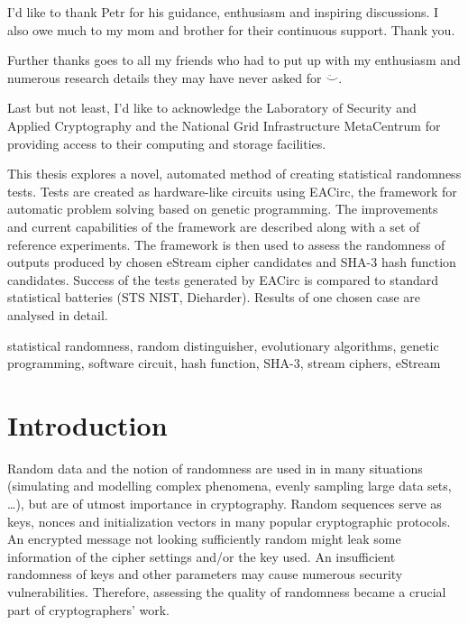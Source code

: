 \documentclass[12pt,twoside]{fithesis2}		%
\renewcommand{\_}{\leavevmode \kern0.0em\vbox{\hrule width0.4em}}
\begin{document}
\FrontMatter
\ThesisTitlePage

\begin{ThesisDeclaration}
\DeclarationText
\AdvisorName
\end{ThesisDeclaration}

\begin{ThesisThanks}
I'd like to thank Petr for his guidance, enthusiasm and inspiring discussions.
I also owe much to my mom and brother for their continuous support. Thank you.

\noindent
Further thanks goes to all my friends who had to put up with my enthusiasm 
and numerous research details they may have never asked for $\ddot\smile$.

\noindent
Last but not least, I'd like to acknowledge the Laboratory of Security and Applied Cryptography and 
the National Grid Infrastructure MetaCentrum for providing access to their computing and storage facilities.
\end{ThesisThanks}

\begin{ThesisAbstract}
This thesis explores a novel, automated method of creating statistical randomness tests. 
Tests are created as hardware-like circuits using
EACirc, the framework for automatic problem solving based on genetic programming. The improvements and current capabilities
of the framework are described along with a set of reference experiments.
The framework is then used to assess the randomness of outputs produced by chosen eStream cipher candidates
and SHA-3 hash function candidates.
Success of the tests generated by EACirc is compared to standard statistical batteries (STS NIST, Dieharder).
Results of one chosen case are analysed in detail.
\end{ThesisAbstract}

\begin{ThesisKeyWords}
statistical randomness, random distinguisher, evolutionary algorithms, genetic programming, software circuit, 
hash function, SHA-3, stream ciphers, eStream
\end{ThesisKeyWords}

\MainMatter
\tableofcontents
\chapter{Introduction}
\label{chap:intro}

Random data and the notion of randomness are used in in many situations (simulating and modelling complex phenomena, 
evenly sampling large data sets, \dots), but are of utmost importance in cryptography.
Random sequences serve as keys, nonces and initialization vectors in many popular cryptographic protocols.
An encrypted message not looking sufficiently random might leak some information of the cipher settings and/or the key used.
An insufficient randomness of keys and other parameters may cause numerous security vulnerabilities.
Therefore, assessing the quality of randomness became a crucial part of cryptographers' work.
\end{document}

